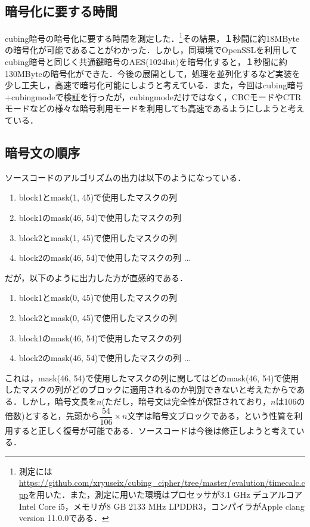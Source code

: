 \documentclass[titlepage]{jarticle}
\begin{document}
\subsection{暗号化に要する時間}
cubing暗号の暗号化に要する時間を測定した．\footnote{測定には\url{https://github.com/xryuseix/cubing_cipher/tree/master/evalution/timecalc.cpp}を用いた．また，測定に用いた環境はプロセッサが3.1 GHz デュアルコアIntel Core i5，メモリが8 GB 2133 MHz LPDDR3，コンパイラがApple clang version 11.0.0である．}その結果，１秒間に約18MByteの暗号化が可能であることがわかった．しかし，同環境でOpenSSLを利用してcubing暗号と同じく共通鍵暗号のAES(1024bit)を暗号化すると，１秒間に約130MByteの暗号化ができた．今後の展開として，処理を並列化するなど実装を少し工夫し，高速で暗号化可能にしようと考えている．また，今回はcubing暗号+cubingmodeで検証を行ったが，cubingmodeだけではなく，CBCモードやCTRモードなどの様々な暗号利用モードを利用しても高速であるようにしようと考えている．

\subsection{暗号文の順序}
ソースコードのアルゴリズムの出力は以下のようになっている．\\
\begin{screen}
  \begin{enumerate}
    \item block1とmask(\hspace{1.8mm}1, 45)で使用したマスクの列
    \item block1のmask(46, 54)で使用したマスクの列
    \item block2とmask(\hspace{1.8mm}1, 45)で使用したマスクの列
    \item block2のmask(46, 54)で使用したマスクの列 ...
  \end{enumerate}
\end{screen}
だが，以下のように出力した方が直感的である．
\begin{screen}
  \begin{enumerate}
    \item block1とmask(\hspace{1.8mm}0, 45)で使用したマスクの列
    \item block2とmask(\hspace{1.8mm}0, 45)で使用したマスクの列
    \item block1のmask(46, 54)で使用したマスクの列
    \item block2のmask(46, 54)で使用したマスクの列 ...
  \end{enumerate}
\end{screen}
これは，mask(46, 54)で使用したマスクの列に関してはどのmask(46, 54)で使用したマスクの列がどのブロックに適用されるのか判別できないと考えたからである．しかし，暗号文長を\(n\)(ただし，暗号文は完全性が保証されており，\(n\)は106の倍数)とすると，先頭から\(\dfrac{54}{106} \times n\)文字は暗号文ブロックである，という性質を利用すると正しく復号が可能である．ソースコードは今後は修正しようと考えている．
\end{document}
